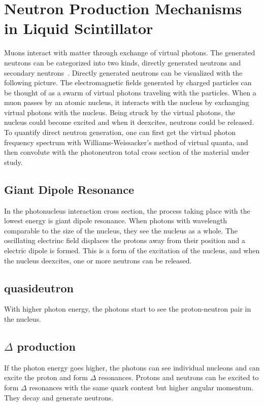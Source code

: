 \chapter{Neutron Production Mechanisms in Liquid Scintillator}

Muons interact with matter through exchange of virtual photons. The generated neutrons can be categorized into two kinds, directly generated neutrons and secondary neutrons~\cite{Malgin2008}. Directly generated neutrons can be visualized with the following picture. The electromagnetic fields generated by charged particles can be thought of as a swarm of virtual photons traveling with the particles. When a muon passes by an atomic nucleus, it interacts with the nucleus by exchanging virtual photons with the nucleus. Being struck by the virtual photons, the nucleus could become excited and when it deexcites, neutrons could be released. To quantify direct neutron generation, one can first get the virtual photon frequency spectrum with Williams-Weissacker's method of virtual quanta, and then convolute with the photoneutron total cross section of the material under study.

\section{Giant Dipole Resonance}
In the photonucleus interaction cross section, the process taking place with the lowest energy is giant dipole resonance. When photons with wavelength comparable to the size of the nucleus, they see the nucleus as a whole. The oscillating electrinc field displaces the protons away from their position and a electric dipole is formed. This is a form of the excitation of the nucleus, and when the nucleus deexcites, one or more neutrons can be released.


\section{quasideutron}
With higher photon energy, the photons start to see the proton-neutron pair in the nucleus.


\section{\texorpdfstring{$\Delta$}{Delta} production}
If the photon energy goes higher, the photons can see individual nucleons and can excite the proton and form $\Delta$ resonances. Protons and neutrons can be excited to form $\Delta$ resonances with the same quark content but higher angular momentum. They decay and generate neutrons.
